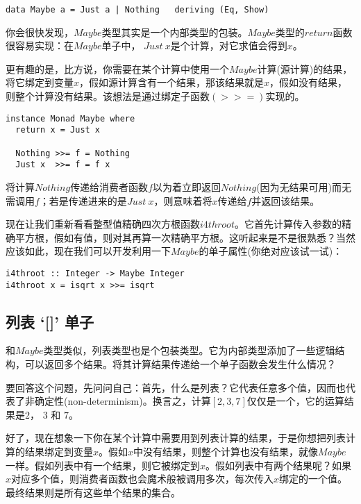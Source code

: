 \begin{lstlisting}
data Maybe a = Just a | Nothing   deriving (Eq, Show)
\end{lstlisting}

你会很快发现，$Maybe$类型其实是一个内部类型的包装。$Maybe$类型的$return$函数很容易实现：在$Maybe$单子中， $Just\ x$是个计算，对它求值会得到$x$。

更有趣的是，比方说，你需要在某个计算中使用一个$Maybe$计算(源计算)的结果，将它绑定到变量$x$，假如源计算含有一个结果，那该结果就是$x$，假如没有结果，则整个计算没有结果。该想法是通过绑定子函数$(>>=)$实现的。

\begin{lstlisting}
instance Monad Maybe where
  return x = Just x

  Nothing >>= f = Nothing
  Just x  >>= f = f x
\end{lstlisting}

将计算$Nothing$传递给消费者函数$f$以为着立即返回$Nothing$(因为无结果可用)而无需调用$f$；若是传递进来的是$Just\ x$，则意味着将$x$传递给$f$并返回该结果。

现在让我们重新看看整型值精确四次方根函数$i4throot$。它首先计算传入参数的精确平方根，假如有值，则对其再算一次精确平方根。这听起来是不是很熟悉？当然应该如此，现在我们可以开发利用一下$Maybe$的单子属性(你绝对应该试一试)：

\begin{lstlisting}
i4throot :: Integer -> Maybe Integer
i4throot x = isqrt x >>= isqrt
\end{lstlisting}

\subsection{列表 `[]' 单子}

和$Maybe$类型类似，列表类型也是个包装类型。它为内部类型添加了一些逻辑结构，可以返回多个结果。将其计算结果传递给一个单子函数会发生什么情况？

要回答这个问题，先问问自己：首先，什么是列表？它代表任意多个值，因而也代表了非确定性(non-determinism)。换言之，计算$[2,3,7]$仅仅是一个，它的运算结果是$2$， $3$ 和 $7$。

好了，现在想象一下你在某个计算中需要用到列表计算的结果，于是你想把列表计算的结果绑定到变量$x$。假如$x$中没有结果，则整个计算也没有结果，就像$Maybe$一样。假如列表中有一个结果，则它被绑定到$x$。假如列表中有两个结果呢？如果$x$对应多个值，则消费者函数也会魔术般被调用多次，每次传入$x$绑定的一个值。最终结果则是所有这些单个结果的集合。

